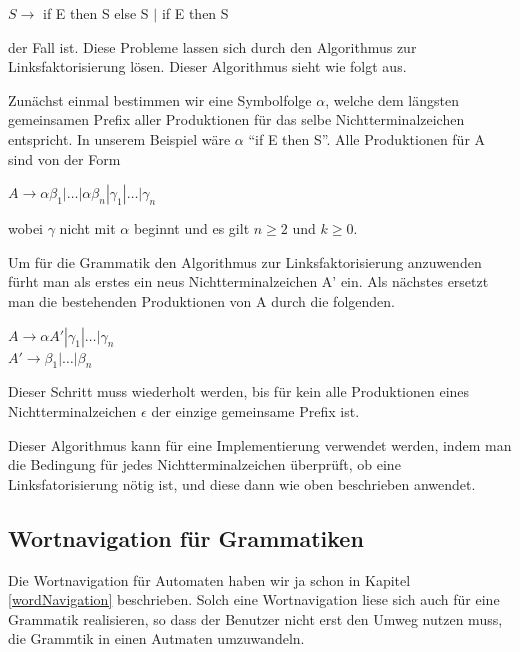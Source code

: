 \noindent
$S \to$ if E then S else S
$|$ if E then S
\vspace{10pt}

\noindent
der Fall ist. Diese Probleme lassen sich durch den Algorithmus zur
Linksfaktorisierung lösen. Dieser Algorithmus sieht wie folgt aus.\vspace{10pt}

Zunächst einmal bestimmen wir eine Symbolfolge $\alpha$, welche dem längsten
gemeinsamen Prefix aller Produktionen für das selbe Nichtterminalzeichen
 entspricht. In unserem Beispiel wäre $\alpha$ "`if E then
S"'. Alle Produktionen für A sind von der Form\vspace{10pt}

\noindent
$A \to \alpha \beta_1|\ldots|\alpha
\beta_n|\gamma_1|\ldots|\gamma_n$
\vspace{10pt}

\noindent
wobei $\gamma$ nicht mit $\alpha$ beginnt und es gilt $n \geq 2$ und $k \geq 0$.
\vspace{10pt}

Um für die Grammatik den Algorithmus zur Linksfaktorisierung anzuwenden fürht
man als erstes ein neus Nichtterminalzeichen A' ein. Als
nächstes ersetzt man die bestehenden Produktionen von A
durch die folgenden.\vspace{10pt}

\noindent
$A \to \alpha A'|\gamma_1|\ldots|\gamma_n$\\
$A' \to \beta_1|\ldots|\beta_n$
\vspace{10pt}

\noindent
Dieser Schritt muss wiederholt werden, bis für kein alle Produktionen eines
Nichtterminalzeichen $\epsilon$ der einzige gemeinsame Prefix ist.\vspace{10pt} 

Dieser Algorithmus kann für eine Implementierung verwendet werden,
indem man die Bedingung für jedes Nichtterminalzeichen überprüft, ob eine Linksfatorisierung
nötig ist, und diese dann wie oben beschrieben anwendet.

\subsection{Wortnavigation für Grammatiken}

Die Wortnavigation für Automaten haben wir ja schon in Kapitel
\ref{wordNavigation} beschrieben. Solch eine Wortnavigation liese sich auch
für eine Grammatik realisieren, so dass der Benutzer nicht erst den Umweg
nutzen muss, die Grammtik in einen Autmaten umzuwandeln.\vspace{10pt}

